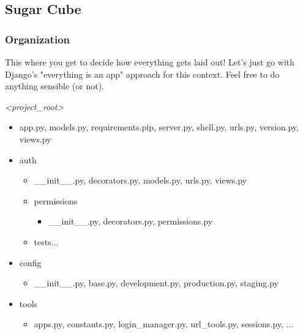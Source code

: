 \documentclass{beamer}
\begin{document}
\subsection{Sugar Cube}
\begin{frame}
\frametitle{Organization}
\begin{block}{This where you get to decide how everything gets laid out!}
Let's just go with Django's "everything is an app" approach for this context. Feel free to do anything sensible (or not).
\end{block}
\tiny
\emph{\textless project\_root\textgreater}
\begin{itemize}
\item app.py, models.py, requirements.pip, server.py, shell.py, urls.py, version.py, views.py
\item auth
  \begin{itemize}
  \tiny
  \item \_\_init\_\_.py, decorators.py, models.py, urls.py, views.py
  \item permissions
    \begin{itemize}
    \tiny
    \item \_\_init\_\_.py, decorators.py, permissions.py
    \end{itemize}
  \item tests...
  \end{itemize}
  \tiny
\item config
  \begin{itemize}
  \tiny
  \item \_\_init\_\_.py, base.py, development.py, production.py, staging.py
  \end{itemize}
\item tools
  \begin{itemize}
  \tiny
  \item apps.py, constants.py, login\_manager.py, url\_tools.py, sessions.py, ...
  \end{itemize}
\end{itemize}
\normalsize
\end{frame}


\end{document}
